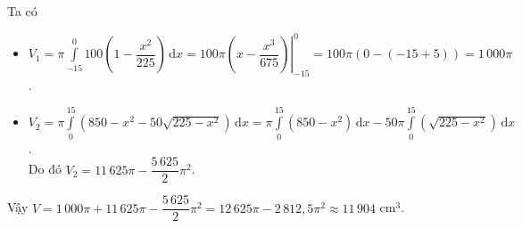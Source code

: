 \begin{ex}
{\begin{itemchoice}
			Ta có
			\begin{itemize}
				\item $V_1 = \pi \displaystyle\int\limits_{-15}^{0} 100 \left( 1 - \dfrac{x^2}{225} \right)\mathrm{\,d}x = 100\pi \left. \left(x - \dfrac{x^3}{675}\right) \right|_{-15}^{0} = 100\pi \left(0 - (-15 + 5)\right) = 1\,000\pi$.
				\item $V_2 = \pi \displaystyle\int\limits_{0}^{15} \left( 850 - x^2 - 50\sqrt{225 - x^2} \right)\mathrm{\,d}x = \pi \displaystyle\int\limits_{0}^{15} \left( 850 - x^2 \right)\mathrm{\,d}x - 50\pi \displaystyle\int\limits_{0}^{15} \left( \sqrt{225 - x^2} \right)\mathrm{\,d}x$.\\
				Do đó $V_2 = 11\,625\pi -\dfrac{5\,625}{2}\pi^2$.
			\end{itemize}
			Vậy	$V = 1\,000\pi + 11\,625\pi - \dfrac{5\,625}{2}\pi^2 = 12\,625\pi - 2\,812{,}5\pi^2 \approx 11\,904$ cm$^3$.\\
		\end{itemchoice}
	}
\end{ex}

